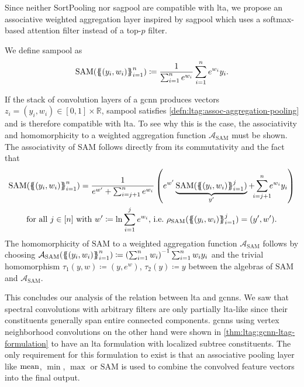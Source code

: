 Since neither SortPooling nor \ac{sagpool} are compatible with \ac{lta}, we propose an associative weighted aggregation layer inspired by \ac{sagpool} which uses a softmax-based attention filter instead of a top-$p$ filter.
\begin{defn}
	We define \ac{sampool} as
	\[\mathrm{SAM}({\ldblbrace (y_i, w_i) \rdblbrace}_{i=1}^n) \coloneqq\frac{1}{\sum_{i=1}^n e^{w_i}} \sum_{i=1}^n e^{w_i} y_i \text{.}\]
\end{defn}
If the stack of convolution layers of a \ac{gcnn} produces vectors $z_i = (y_i, w_i) \in [0, 1] \times \mathbb{R}$, \ac{sampool} satisfies \cref{defn:ltag:assoc-aggregation-pooling} and is therefore compatible with \acs{lta}.
To see why this is the case, the associativity and homomorphicity to a weighted aggregation function $\mathcal{A}_{\mathrm{SAM}}$ must be shown.
The associativity of $\mathrm{SAM}$ follows directly from its commutativity and the fact that
\begin{gather*}
	\mathrm{SAM}({\ldblbrace (y_i, w_i) \rdblbrace}_{i=1}^n) = \frac{1}{e^{w'} + \sum_{i=j+1}^n e^{w_i}} \left( e^{w'} \underbrace{\mathrm{SAM}({\ldblbrace (y_i, w_i) \rdblbrace}_{i=1}^j)}_{y'} + \smashoperator{\sum_{i=j+1}^n} e^{w_i} y_i \right) \\
	\text{for all } j \in [n] \text{ with } w' \coloneqq \ln\sum_{i=1}^{j} e^{w_i} \text{, i.e.\ } \rho_{\mathrm{SAM}}({\ldblbrace (y_i, w_i) \rdblbrace}_{i=1}^j) = (y', w')\text{.}
\end{gather*}
The homomorphicity of $\mathrm{SAM}$ to a weighted aggregation function $\mathcal{A}_{\mathrm{SAM}}$ follows by choosing $\mathcal{A}_{\mathrm{SAM}}({\ldblbrace (y_i, w_i) \rdblbrace}_{i=1}^n) \coloneqq {\left(\sum_{i=1}^n w_i\right)}^{-1} \sum_{i=1}^n w_i y_i$ and the trivial homomorphism $\tau_1(y, w) \coloneqq (y, e^w)$, $\tau_2(y) \coloneqq y$ between the algebras of $\mathrm{SAM}$ and $\mathcal{A}_{\mathrm{SAM}}$.

This concludes our analysis of the relation between \ac{lta} and \acp{gcnn}.
We saw that spectral convolutions with arbitrary filters are only partially \acs{lta}-like since their constituents generally span entire connected components.
\Acp{gcnn} using vertex neighborhood convolutions on the other hand were shown in \cref{thm:ltag:gcnn-ltag-formulation} to have an \ac{lta} formulation with localized subtree constituents.
The only requirement for this formulation to exist is that an associative pooling layer like $\operatorname{mean}$, $\min$, $\max$ or $\mathrm{SAM}$ is used to combine the convolved feature vectors into the final output.
